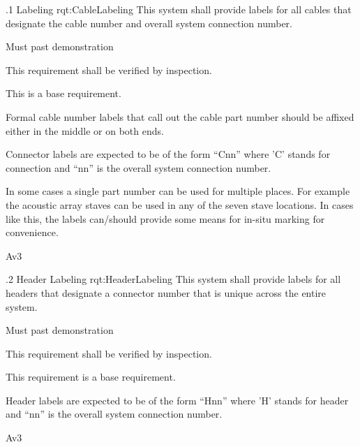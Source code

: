 \ONERQMTV
{\RqtNumberBase.1}
{Labeling}
{rqt:CableLabeling}
{
This system shall provide labels for all cables that designate the cable number and overall system connection number.
}
{
	\item [Phase 1] Must past demonstration
}
{This requirement shall be verified by inspection.}
{
	\item [N/A] This is a base requirement.
}
{
	\item Formal cable number labels that call out the cable part number should be affixed either in the middle or on both ends.
	\item Connector labels are expected to be of the form ``Cnn'' where 'C' stands for connection and ``nn'' is the overall system connection number.
	\item In some cases a single part number can be used for multiple places. For example the acoustic array staves can be used in any of the seven stave locations. In cases like this, the labels can/should provide some means for in-situ marking for convenience. 
}
{Av3}


\ONERQMTV
{\RqtNumberBase.2}
{Header Labeling}
{rqt:HeaderLabeling}
{
This system shall provide labels for all headers that designate a connector number that is unique across the entire system.
}
{
	\item [Phase 1] Must past demonstration
}
{This requirement shall be verified by inspection.}
{
	\item [N/A] This requirement is a base requirement.
}
{
	\item Header labels are expected to be of the form ``Hnn'' where 'H' stands for header and ``nn'' is the overall system connection number.

}
{Av3}


